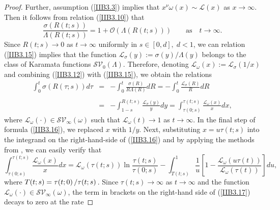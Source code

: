\documentclass[10pt,reqno]{amsart}
\theoremstyle{definition}
\numberwithin{equation}{section}
\begin{document}
\begin{proof}
    Further, assumption {(\ref{IIB3.3})} implies that ${x^{\nu}}\omega(x)\sim\mathcal{L}(x)$ as $x\to\infty$.
    Then it follows from relation {(\ref{IIB3.10})} that
\begin{equation}                              \label{IIB3.15}
    \frac{\sigma(R(t;s))}{\Lambda(R(t;s))}=1+\mathcal{O}\left(\Lambda(R(t;s))\right)
    \qquad {\text{as}} \quad {t\to\infty}.
\end{equation}
    Since $R(t;s)\to{0}$ as $t\to\infty$ uniformly in $s\in[0,d],\;d<1$, we can relation {(\ref{IIB3.15})} implies that
    the function ${{\mathcal{L}}_{\sigma}}(y):={\sigma(y)}/{\Lambda(y)}$ belongs to the class of Karamata functions
    ${{\mathcal{SV}}_{0}}(\Lambda)$. Therefore, denoting ${{\mathcal{L}}_{\omega}}(x):={{\mathcal{L}}_{\sigma}}\left(1/x\right)$
    and combining {(\ref{IIB3.12})} with {(\ref{IIB3.15})}, we obtain the relations
\begin{eqnarray}                              \label{IIB3.16}
    {\int_{0}^{t}{\sigma\left(R(\tau;s)\right)d\tau}}
& = & -\int_{0}^{t}{\frac{\sigma(R)}{R\Lambda(R)}dR}=-\int_{0}^{t}{\frac{{{\mathcal{L}}_{\sigma}}(R)}{R}dR} \nonumber\\
\ \nonumber\\
& = & -\int_{1-s}^{R(t;s)}{\frac{{{\mathcal{L}}_{\sigma }}(y)}{y}dy}
        =\int_{\tau(0;s)}^{\tau(t;s)}{\frac{{{\mathcal{L}}_{\omega }}(x)}{x}dx},
\end{eqnarray}
    where ${{\mathcal{L}}_{\omega}}(\cdot)\in{{\mathcal{SV}}_{\infty}}(\omega)$ such that ${{\mathcal{L}}_{\omega}}(t)\to{1}$
    as $t\to\infty$. In the final step of formula {(\ref{IIB3.16})}, we replaced $x$ with ${1}/{y}$. Next,
    substituting $x=u\tau(t;s)$ into the integrand on the right-hand-side of {(\ref{IIB3.16})} and by applying
    the methods from {\cite{ImMDPI24}}, we can easily verify that
\begin{equation}                              \label{IIB3.17}
    \int_{\tau(0;s)}^{\tau(t;s)}{\frac{{{\mathcal{L}}_{\omega}}(x)}{x}dx}={{\mathcal{L}}_{\omega}}(\tau(t;s))
    \ln\frac{\tau(t;s)}{\tau(0;s)}-\int_{T(t;s)}^{1}{\frac{1}{u}\left[1-
    \frac{{{\mathcal{L}}_{\omega}}(u\tau(t))}{{{\mathcal{L}}_{\omega}}(\tau(t))}\right]du},
\end{equation}
    where $T(t;s)={\tau(t;0)}\left/{\tau(t;s)}\right.$. Since $\tau(t;s)\to\infty$ as $t\to\infty$ and the function
    ${{\mathcal{L}}_{\omega}}(\cdot)\in{{\mathcal{SV}}_{\infty}}(\omega)$, the term in brackets on
    the right-hand side of {(\ref{IIB3.17})} decays to zero at the rate

\end{proof}
\end{document}
